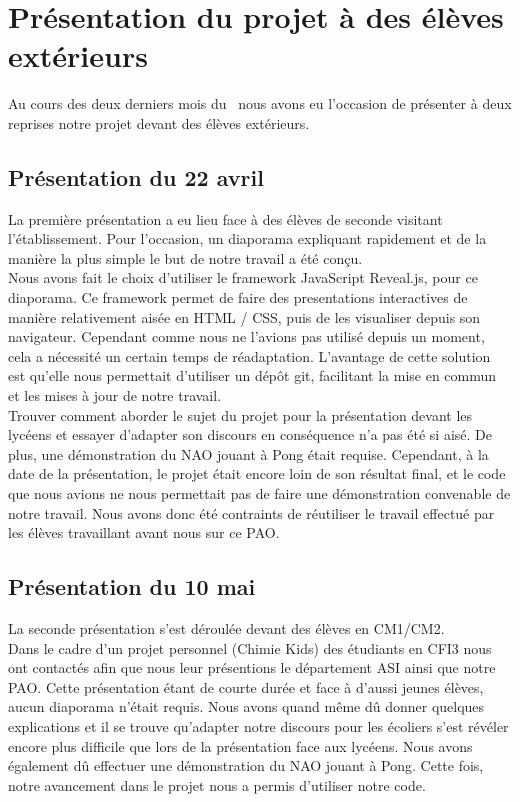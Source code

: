 \section{Présentation du projet à des élèves extérieurs}
\label{sec:Présentation du projet à des élèves extérieurs}
  \par Au cours des deux derniers mois du \pao\ nous avons eu l'occasion de présenter à deux reprises notre projet devant des élèves extérieurs.\\

  \subsection{Présentation du 22 avril}
  \label{sub:Présentation du 22 avril}
    \par La première présentation a eu lieu face à des élèves de seconde visitant l'établissement.
    Pour l'occasion, un diaporama expliquant rapidement et de la manière la plus simple le but de notre travail a été conçu.\\
    Nous avons fait le choix d'utiliser le framework JavaScript Reveal.js, pour ce diaporama.
    Ce framework permet de faire des presentations interactives de manière relativement aisée en HTML / CSS, puis de les visualiser depuis son navigateur.
    Cependant comme nous ne l’avions pas utilisé depuis un moment, cela a nécessité un certain temps de réadaptation.
    L'avantage de cette solution est qu'elle nous permettait d'utiliser un dépôt git, facilitant la mise en commun et les mises à jour de notre travail.\\
    Trouver comment aborder le sujet du projet pour la présentation devant les lycéens et essayer d’adapter son discours en conséquence n’a pas été si aisé.
    De plus, une démonstration du NAO jouant à Pong était requise.
    Cependant, à la date de la présentation, le projet était encore loin de son résultat final, et le code que nous avions ne nous permettait pas de faire une démonstration convenable de notre travail.
    Nous avons donc été contraints de réutiliser le travail effectué par les élèves travaillant avant nous sur ce PAO.\\

  \subsection{Présentation du 10 mai}
  \label{sub:Présentation du 10 mai}
    \par La seconde présentation s'est déroulée devant des élèves en CM1/CM2. \\
    Dans le cadre d'un projet personnel (Chimie Kids) des étudiants en CFI3 nous ont contactés afin que nous leur présentions le département ASI ainsi que notre PAO.
    Cette présentation étant de courte durée et face à d'aussi jeunes élèves, aucun diaporama n'était requis.
    Nous avons quand même dû donner quelques explications et il se trouve qu'adapter notre discours pour les écoliers s'est révéler encore plus difficile que lors de la présentation face aux lycéens.
    Nous avons également dû effectuer une démonstration du NAO jouant à Pong.
    Cette fois, notre avancement dans le projet nous a permis d'utiliser notre code.
\pagebreak
